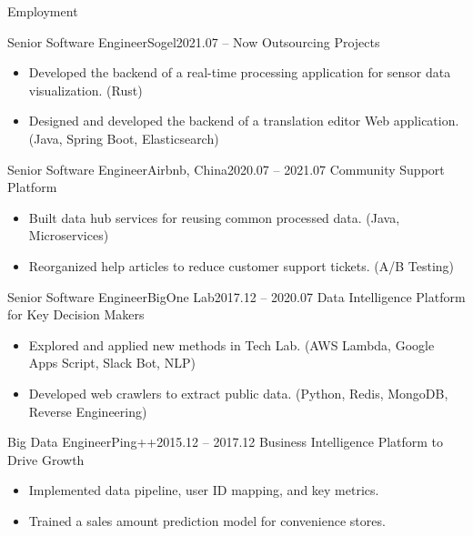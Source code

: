 \documentclass[]{mcdowellcv}
\begin{document}
	\makeheader
	
	\begin{cvsection}{Employment}
		\begin{cvsubsection}{Senior Software Engineer}{Sogel}{2021.07 – Now}
			Outsourcing Projects
			\begin{itemize}
				\item Developed the backend of a real-time processing application for sensor data visualization. (Rust)
				\item Designed and developed the backend of a translation editor Web application. (Java, Spring Boot, Elasticsearch)
			\end{itemize}
		\end{cvsubsection}

		\begin{cvsubsection}{Senior Software Engineer}{Airbnb, China}{2020.07 – 2021.07}
			Community Support Platform
			\begin{itemize}
				\item Built data hub services for reusing common processed data. (Java, Microservices)
				\item Reorganized help articles to reduce customer support tickets. (A/B Testing)
			\end{itemize}
		\end{cvsubsection}

		\begin{cvsubsection}{Senior Software Engineer}{BigOne Lab}{2017.12 – 2020.07}
			Data Intelligence Platform for Key Decision Makers
			\begin{itemize}
				\item Explored and applied new methods in Tech Lab. (AWS Lambda, Google Apps Script, Slack Bot, NLP)
				\item Developed web crawlers to extract public data. (Python, Redis, MongoDB, Reverse Engineering)
			\end{itemize}
		\end{cvsubsection}

		\begin{cvsubsection}{Big Data Engineer}{Ping++}{2015.12 – 2017.12}
			Business Intelligence Platform to Drive Growth
			\begin{itemize}
				\item Implemented data pipeline, user ID mapping, and key metrics.
				\item Trained a sales amount prediction model for convenience stores.
			\end{itemize}
		\end{cvsubsection}
		

\end{cvsection}
\end{document}
